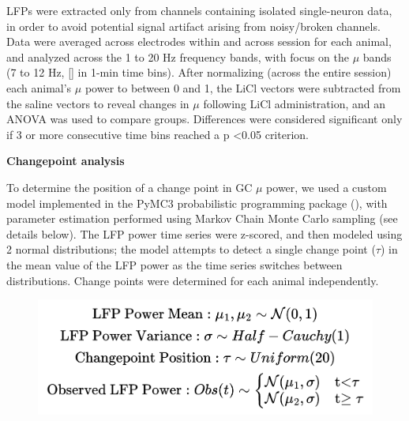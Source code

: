 \begin{refsection}
LFPs were extracted only from channels containing isolated single-neuron data, in order to avoid potential signal artifact arising from noisy/broken channels. Data were averaged across electrodes within and across session for each animal, and analyzed across the 1 to 20 Hz frequency bands, with focus on the \(\mu\) bands (7 to 12 Hz, [\cite{tort2010a,tort2010b,thomson1991a}] in 1-min time bins). After normalizing (across the entire session) each animal’s \(\mu\) power to between 0 and 1, the LiCl vectors were subtracted from the saline vectors to reveal changes in \(\mu\) following LiCl administration, and an ANOVA was used to compare groups. Differences were considered significant only if 3 or more consecutive time bins reached a p \textless 0.05 criterion.

\smallskip
\noindent\textbf{Changepoint analysis}\par
\noindent 
To determine the position of a change point in GC \(\mu\) power, we used a custom model implemented in the PyMC3 probabilistic programming package (\cite{salvatier2016a}), with parameter estimation performed using Markov Chain Monte Carlo sampling (see details below). The LFP power time series were z-scored, and then modeled using 2 normal distributions; the model attempts to detect a single change point (\(\tau\)) in the mean value of the LFP power as the time series switches between distributions. Change points were determined for each animal independently.

\begin{figure}
\centering
\includegraphics[width=0.7\linewidth]{stone_2022_figs/brad_lfp_changepoint_eqs.png}
\end{figure}



\end{refsection}
